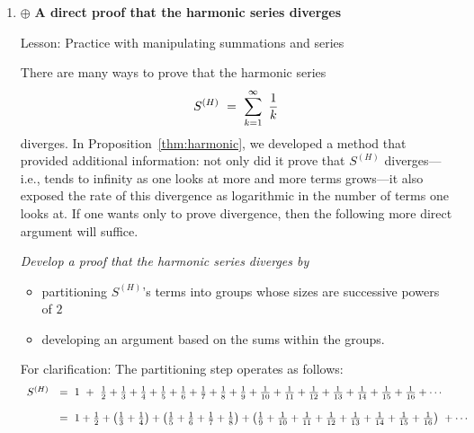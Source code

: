\begin{enumerate}
\medskip\item
$\oplus$ {\bf A direct proof that the harmonic series diverges}

{\sc Lesson:}
Practice with manipulating summations and series

\smallskip

There are many ways to prove that the harmonic series
\[ S^{(H)} \ = \ \sum_{k=1}^\infty \ {1 \over k} \]
diverges.  In Proposition~\ref{thm:harmonic}, we developed a method that provided additional information: not only did it prove that $S^{(H)}$ diverges---i.e., tends to infinity as one looks at more and more terms grows---it also exposed the rate of this divergence as logarithmic in the number of terms one looks at.  If one wants only to prove divergence, then the following more direct argument will suffice.

\medskip

{\em Develop a proof that the harmonic series diverges by
\begin{itemize}
\item
partitioning $S^{(H)}$'s terms into groups whose sizes are successive powers of $2$
\medskip\item
developing an argument based on the sums within the groups.
\end{itemize}
}

\smallskip

For clarification:
The partitioning step operates as follows:
{\footnotesize
\[ 
\begin{array}{ll}
S^{(H)} 
             & = \ 1 \ + \ {1 \over 2} + {1 \over 3} + {1 \over 4} + {1 \over 5} + {1 \over 6}+ {1 \over 7} + {1 \over 8} + {1 \over 9} + {1 \over 10}+ {1 \over 11}  +{1 \over 12} + {1 \over 13} + {1 \over 14} + {1 \over 15} + {1 \over 16} + \cdots \\
             & \\
              & = \ 1  + {1 \over 2} + \left(  {1 \over 3}   +  {1 \over 4}  \right) + \left( {1 \over 5} + {1 \over 6}+ {1 \over 7}  +  {1 \over 8} \right) + \left( {1 \over 9} + {1 \over 10}+ {1 \over 11}  +{1 \over 12} + {1 \over 13} + {1 \over 14} + {1 \over 15} + {1 \over 16} \right) \ +\cdots
\end{array} \]
}



\end{enumerate}
